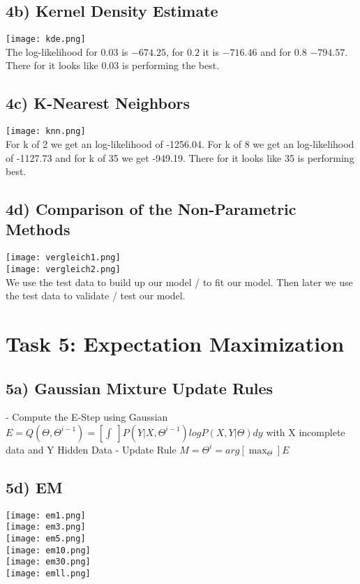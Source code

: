 \documentclass{article}
\begin{document}
 

\subsection{4b) Kernel Density Estimate}
\texttt{[image: kde.png]}\\
The log-likelihood for $0.03$ is $-674.25$, for $0.2$ it is $-716.46$ and for $0.8$ $-794.57$. There for it looks like $0.03$ is performing the best.
 

\subsection{4c) K-Nearest Neighbors}
\texttt{[image: knn.png]}\\
For k of 2 we get an log-likelihood of -1256.04. For k of 8 we get an log-likelihood of -1127.73 and for k of 35 we get -949.19. There for it looks like 35 is performing best.



\subsection{4d) Comparison of the Non-Parametric Methods}
\texttt{[image: vergleich1.png]}\\
\texttt{[image: vergleich2.png]}\\
We use the test data to build up our model / to fit our model. Then later we use the test data to validate / test our model.
\section{Task 5: Expectation Maximization}
\subsection{5a) Gaussian Mixture Update Rules}

- Compute the E-Step using Gaussian
$E = Q(\Theta , \Theta^{i-1}) = [ \int_{}^{} \, ] P(Y  \vert X, \Theta^{i-1}) log P(X,Y \vert \Theta) dy $
\newline
with X incomplete data and Y Hidden Data
\newline
- Update Rule
$M = \Theta^{i} = arg [\max_{\Theta}] E$

\subsection{5d) EM}
\texttt{[image: em1.png]}\\
\texttt{[image: em3.png]}\\
\texttt{[image: em5.png]}\\
\texttt{[image: em10.png]}\\
\texttt{[image: em30.png]}\\
\texttt{[image: emll.png]}\\


\end{document}

